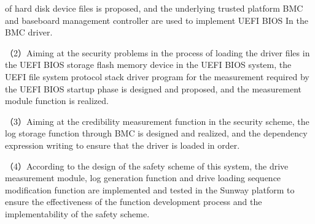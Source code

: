 \begin{eabstract}
of hard disk device files is proposed, and the underlying trusted platform BMC and baseboard 
management controller are used to implement UEFI BIOS In the BMC driver.
\par （2）Aiming at the security problems in the process of loading the driver files in the UEFI BIOS 
storage flash memory device in the UEFI BIOS system, the UEFI file system protocol stack driver 
program for the measurement required by the UEFI BIOS startup phase is designed and proposed, and 
the measurement module function is realized.
\par （3）Aiming at the credibility measurement function in the security scheme, the log storage 
function through BMC is designed and realized, and the dependency expression writing to ensure that 
the driver is loaded in order.
\par （4）According to the design of the safety scheme of this system, the drive measurement module, 
log generation function and drive loading sequence modification function are implemented and 
tested in the Sunway platform to ensure the effectiveness of the function development process 
and the implementability of the safety scheme.

\end{eabstract}

